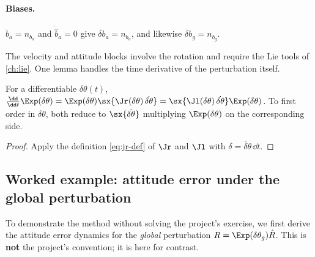 \paragraph{Biases.} $\dot b_a = n_{b_a}$ and $\dot{\hat b}_a = 0$ give $\dot{\delta b}_a = n_{b_a}$, and likewise
$\dot{\delta b}_g = n_{b_g}$.

The velocity and attitude blocks involve the rotation and require the Lie tools of \cref{ch:lie}. One lemma
handles the time derivative of the perturbation itself.

\begin{lemma}
\label{lem:dexp}
For a differentiable $\delta\theta(t)$,
$\frac{\dd}{\dd t}\Exp(\delta\theta) = \Exp(\delta\theta)\sx{\Jr(\delta\theta)\,\dot{\delta\theta}} = \sx{\Jl(\delta\theta)\,\dot{\delta\theta}}\Exp(\delta\theta)$.
To first order in $\delta\theta$, both reduce to $\sx{\dot{\delta\theta}}$ multiplying $\Exp(\delta\theta)$ on the corresponding side.
\end{lemma}
\begin{proof}
Apply the definition \eqref{eq:jr-def} of $\Jr$ and $\Jl$ with $\delta = \dot{\delta\theta}\,\dd t$.
\end{proof}

\subsection{Worked example: attitude error under the global perturbation}

To demonstrate the method without solving the project's exercise, we first derive the attitude error
dynamics for the \emph{global} perturbation $R = \Exp(\delta\theta_g)\hat R$. This is \textbf{not} the project's
convention; it is here for contrast.

